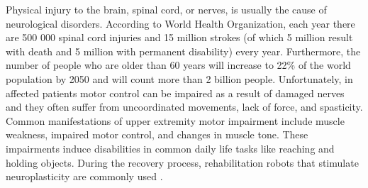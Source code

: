 %
%
%
Physical injury to the brain, spinal cord, or nerves, is usually the cause of neurological disorders. According to World Health Organization, each year there are 500 000 spinal cord injuries and 15 million strokes (of which 5 million result with death and 5 million with permanent disability) every year. Furthermore, the number of people who are older than 60 years will increase to 22\% of the world population by 2050 and will count more than 2 billion people. Unfortunately, in affected patients motor control can be impaired as a result of damaged nerves and they often suffer from uncoordinated movements, lack of force, and spasticity. Common manifestations of upper extremity motor impairment include muscle weakness, impaired motor control, and changes in muscle tone. These impairments induce disabilities in common daily life tasks like reaching and holding objects. During the recovery process, rehabilitation robots that stimulate neuroplasticity are commonly used \citep{VacaBenitez2013, Dipietro2005, Marchal-Crespo2009, Cesqui2013}. 

